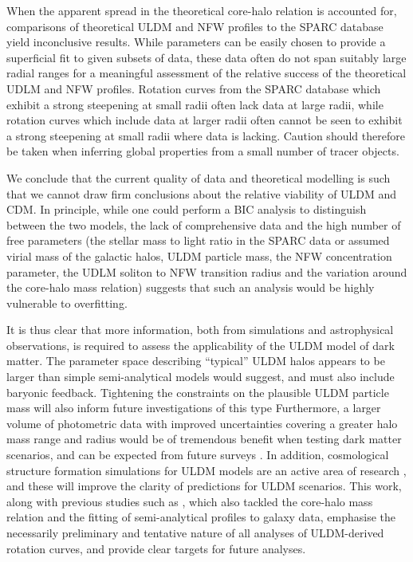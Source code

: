 \documentclass{pasa}%
\begin{document}
When the apparent spread in the theoretical core-halo relation is accounted for, comparisons of theoretical ULDM and NFW profiles to the SPARC database yield inconclusive results. While parameters can be easily chosen to provide a superficial fit to given subsets of data, these data often do not span suitably large radial ranges for a meaningful assessment of the relative success of the theoretical UDLM and NFW profiles. Rotation curves from the SPARC database which exhibit a strong steepening at small radii often lack data at large radii, while rotation curves which include data at larger radii often cannot be seen to exhibit a strong steepening at small radii where data is lacking. Caution should therefore be taken when inferring global properties from a small number of tracer objects.

We conclude that the current quality of data and theoretical modelling is such that we cannot draw firm conclusions about the relative viability of ULDM and CDM. In principle, while one could perform a BIC analysis to distinguish between the two models, the lack of comprehensive data and the high number of free parameters (the stellar mass to light ratio in the SPARC data or assumed virial mass of the galactic halos,  ULDM particle mass, the NFW concentration parameter, the UDLM soliton to NFW transition radius and the variation around the core-halo mass relation) suggests that such an analysis would be highly vulnerable to overfitting.

It is thus clear that more information, both from simulations and astrophysical observations, is required to  assess the applicability of the ULDM model of dark matter. The parameter space describing ``typical'' ULDM halos appears to be larger than simple semi-analytical models would suggest, and must also include  baryonic feedback. Tightening the constraints on the plausible ULDM particle mass will also inform future investigations of this type \cite{Castellano:2019hdd, Lidz:2018fqo, Davoudiasl:2019nlo} Furthermore, a larger volume of photometric data with improved uncertainties covering a greater halo mass range and radius would be of tremendous benefit when testing dark matter scenarios, and can be expected from future surveys \cite{Simon:2019kmm}. In addition, cosmological structure formation simulations for ULDM models are an active area of research \cite{Lin:2018whl, Clough:2018exo, Mocz:2015sda}, and these will improve the clarity of predictions for ULDM scenarios. 
This work, along with previous studies such as \cite{Bar2018acw}, which also tackled the core-halo mass relation and the fitting of semi-analytical profiles to galaxy data, emphasise the necessarily preliminary and tentative nature of all analyses of ULDM-derived rotation curves, and provide clear targets for future analyses. 
\end{document}
